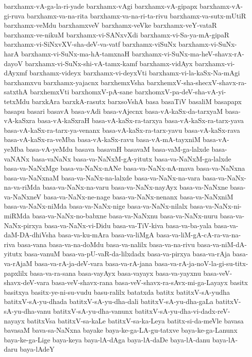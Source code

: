 {barxhamx-vA-ga-la-ri-yade
barxhamx-vAgi
barxhamx-vA-gipapx
barxhamx-vA-gi-ruva
barxhamx-va-na-rita
barxhamx-va-na-ri-ta-rivu
barxhamx-va-sutx-mUtiR
barxhamx-veMdu
barxhamxveV
barxhamx-veVke
barxhamx-veY-vataR
barxhamx-ve-nikuM
barxhamx-vi-SANxvXdi
barxhamx-vi-Sa-ya-mA-gipaR
barxhamx-vi-SiNxvXV-sha-deV-va-vatf
barxhamx-viSuNx
barxhamx-vi-SuNx-harA
barxhamx-vi-SuNx-ma-hA-tamxnaH
barxhamx-vi-SuNx-ma-heV-shavx-rA-dayoV
barxhamx-vi-SuNx-shi-vA-tamx-kamf
barxhamx-vidAyx
barxhamx-vi-dAyxmf
barxhamx-videyx
barxhamx-vi-deyxVti
barxhamx-vi-la-kaSx-Na-mAgi
barxhamxvu
barxhamx-yajacnx
barxhemxVsha
barxhemxV-sha-shecxV-shavx-ra-satxthA
barxhemxVti
barxhomxV-pA-sane
barxhomxV-pa-deV-sha-vA-yi-tetxMdu
barxkAra
barxkA-rasutx
barxsoVshA
basa
basaTiV
basaliM
basapapx
basapu
basari
basavA
basa-vAdi
basa-vAjecnx
basa-vA-kaSx-da-tarxyaM
basa-vA-kaSxra
basa-vA-kaSxraH
basa-vA-kaSx-ra-tarxya
basa-vA-kaSx-ra-tarx-yava
basa-vA-kaSx-ra-tarx-ya-venanx
basa-vA-kaSx-ra-tarx-yavu
basa-vA-kaSx-rava
basa-vA-kaSx-ra-veMba
basa-vA-kaSx-ravu
basa-vA-mA-tayxniM
basa-vA-yeMba
basa-vA-yeMdu
basava
basavaH
basavaM
basa-vaM-ga-lalxde
basa-vaNANx
basa-vaNaNx
basa-va-NaNxM-gA-yitutx
basa-va-NaNxM-ga-lalxde
basa-va-NaNxMge
basa-va-NaNx-nANe
basa-va-NaNx-nA-mava
basa-va-NaNxna
basa-va-NaNxnaM
basa-va-NaNx-na-lalxde
basa-va-NaNx-na-vara
basa-va-NaNx-na-va-riMda
basa-va-NaNx-na-varu
basa-va-NaNx-nayAyx
basa-va-NaNxne
basa-va-NaNxneV
basa-va-NaNx-ne-nage
basa-va-NaNx-nenanx
basa-va-NaNxniM
basa-va-NaNx-niMda
basa-va-NaNx-nige
basa-va-NaNx-nilalx
basa-va-NaNx-ni-miRMda
basa-va-NaNx-no-babxne
basa-va-NaNxnu
basa-va-NaNx-nuru
basa-va-NaNx-pirxya
basa-va-NaNx-vi-Didu
basa-va-TiV-kiva
basa-va-ba-yala
basa-va-daM-DA-dhiVsha
basa-va-ku-mAra
basa-va-liMgA
basa-va-liM-gA-cA-ra-va-na-riva
basa-vana
basa-va-na-doMdu
basa-va-nalilx
basa-va-na-rivu
basa-va-niM-dA-yitutx
basa-vanuM
basa-va-pU-vaR-da-lilxdadx
basa-va-pirxya
basa-va-rAja
basa-va-rAjaM
basa-va-rA-ja-deV-vara
basa-va-rA-jana
basa-va-rA-ja-noV-la-gi-su-titx-papxlilx
basa-va-ra-sana
basa-vayAyx
basa-vayayx
basa-va-yayxnu
basa-veV-shavx-deV-vara
basa-veV-shavx-rana
basa-veV-shavx-ra-sAvx-mi-ga-Layayx
basitx
basitxya
basitx-ye-ni-su-vudu
basu-ralilx
batatxda
batitx
batitxV-sA-yudha
batitxV-sA-yu-dhada
batitxV-sA-yu-dha-dali
batitxV-sA-yu-dha-gaLa
batitxV-sA-yu-dha-vanu
batitxV-sA-yu-dha-vanunx
batitxV-sA-yu-dha-vi-dadx-reV-nayayx
batitxVsa
batitxV-sa-kaLe
batitxV-sa-ka-Leya
batitx-si-da-meVle
bavasa
bavasaM
bava-sa-NaNxna
bayake
baya-ke-ga-LA-gu-tatxve
baya-ke-ga-Lanunx
baya-ke-ga-Lige
baya-keya
baya-lA-dAga
baya-lA-daDe
baya-lA-danu
baya-lA-daru
baya-lAdeY
}
